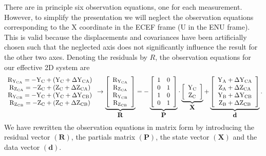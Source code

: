 There are in principle six observation equations, one for each measurement.  However, to simplify the presentation we will neglect the observation equations corresponding to the X coordinate in the ECEF frame (U in the ENU frame).  This is valid because the displacements and covariances have been artificially chosen such that the neglected axis does not significantly influence the result for the other two axes.  Denoting the residuals by $R$, the observation equations for our effective 2D system are
\begin{equation}
\begin{array}{c}
\text{R}_{\text{Y}_{\text{CA}}}=-\text{Y}_{\text{C}}+\left(\text{Y}_{\text{C}}+\Delta\text{Y}_{\text{CA}}\right)\\
\text{R}_{\text{Z}_{\text{CA}}}=-\text{Z}_{\text{C}}+\left(\text{Z}_{\text{C}}+\Delta\text{Z}_{\text{CA}}\right)\\
\text{R}_{\text{Y}_{\text{CB}}}=-\text{Y}_{\text{C}}+\left(\text{Y}_{\text{C}}+\Delta\text{Y}_{\text{CB}}\right)\\
\text{R}_{\text{Z}_{\text{CB}}}=-\text{Z}_{\text{C}}+\left(\text{Z}_{\text{C}}+\Delta\text{Z}_{\text{CB}}\right)
\end{array}\rightarrow\mathop{\underbrace{\left[\begin{array}{c}\text{R}_{\text{Y}_{\text{CA}}}\\\text{R}_{\text{Z}_{\text{CA}}}\\\text{R}_{\text{Y}_{\text{CB}}}\\\text{R}_{\text{Z}_{\text{CB}}}\end{array}\right]}_{\displaystyle{\mathbf{R}}}}=-\mathop{\underbrace{\left[\begin{array}{cc}1&0\\0&1\\1&0\\0&1\end{array}\right]}_{\displaystyle{\mathbf{P}}}}\cdot\mathop{\underbrace{\left[\begin{array}{c}\text{Y}_{\text{C}}\\\text{Z}_{\text{C}}\end{array}\right]}_{\displaystyle{\mathbf{X}}}}+\mathop{\underbrace{\left[\begin{array}{c}\text{Y}_{\text{A}}+\Delta\text{Y}_{\text{CA}}\\\text{Z}_{\text{A}}+\Delta\text{Z}_{\text{CA}}\\\text{Y}_{\text{B}}+\Delta\text{Y}_{\text{CB}}\\\text{Z}_{\text{B}}+\Delta\text{Z}_{\text{CB}}\end{array}\right]}_{\displaystyle{\mathbf{d}}}}.
\end{equation}
We have rewritten the observation equations in matrix form by introducing the residual vector $(\mathbf{R})$, the partials matrix $(\mathbf{P})$, the state vector $(\mathbf{X})$ and the data vector $(\mathbf{d})$.

